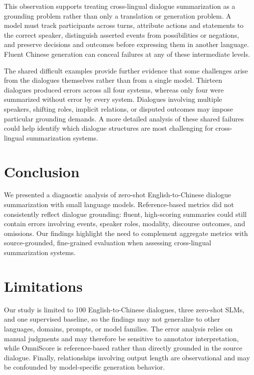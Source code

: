 \documentclass[11pt]{article}
\begin{document}
This observation supports treating cross-lingual dialogue summarization as a grounding problem rather than only a translation or generation problem. A model must track participants across turns, attribute actions and statements to the correct speaker, distinguish asserted events from possibilities or negations, and preserve decisions and outcomes before expressing them in another language. Fluent Chinese generation can conceal failures at any of these intermediate levels.

The shared difficult examples provide further evidence that some challenges arise from the dialogues themselves rather than from a single model. Thirteen dialogues produced errors across all four systems, whereas only four were summarized without error by every system. Dialogues involving multiple speakers, shifting roles, implicit relations, or disputed outcomes may impose particular grounding demands. A more detailed analysis of these shared failures could help identify which dialogue structures are most challenging for cross-lingual summarization systems.


\section{Conclusion}

We presented a diagnostic analysis of zero-shot English-to-Chinese dialogue summarization with small language models. Reference-based metrics did not consistently reflect dialogue grounding: fluent, high-scoring summaries could still contain errors involving events, speaker roles, modality, discourse outcomes, and omissions. Our findings highlight the need to complement aggregate metrics with source-grounded, fine-grained evaluation when assessing cross-lingual summarization systems.

\section{Limitations}

Our study is limited to 100 English-to-Chinese dialogues, three zero-shot SLMs, and one supervised baseline, so the findings may not generalize to other languages, domains, prompts, or model families. The error analysis relies on manual judgments and may therefore be sensitive to annotator interpretation, while OmniScore is reference-based rather than directly grounded in the source dialogue. Finally, relationships involving output length are observational and may be confounded by model-specific generation behavior.
\end{document}
